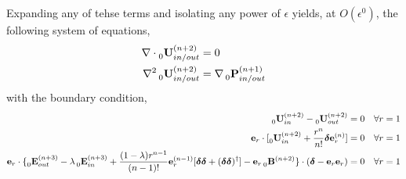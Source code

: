 Expanding any of tehse terms and isolating any power of $\epsilon$ yields, at $O(\epsilon^0)$, the following system of equations, 
\begin{align*}
    \mathbf{\nabla}\cdot \prescript{}{0}{\textbf{U}}_{in/out}^{(n+2)} &= 0 \\
    \mathbf{\nabla}^2\prescript{}{0}{\textbf{U}}_{in/out}^{(n+2)} &= \mathbf{\nabla} \prescript{}{0}{\textbf{P}}_{in/out}^{(n+1)} \\
\end{align*}
with the boundary condition, 
\begin{align}
    \prescript{}{0}{\textbf{U}}_{in}^{(n+2)} - \prescript{}{0}{\textbf{U}}_{out}^{(n+2)}
    &=
    0
    &&\forall r = 1 
    \\
    \textbf{e}_r\cdot [\prescript{}{0}{\textbf{U}}_{in}^{(n+2)} 
    +\frac{r^n}{n!}\bm\delta \textbf{e}_r^{(n)}] &= 0 
    &&\forall r = 1 \\
    \textbf{e}_r\cdot \{
        \prescript{}{0}{\textbf{E}}_{out}^{(n+3)}
        -\lambda\prescript{}{0}{\textbf{E}}_{in}^{(n+3)}
        +\frac{(1-\lambda)r^{n-1}}{(n-1)!}
        \textbf{e}_r^{(n-1)}[\bm\delta\bm\delta + (\bm\delta\bm\delta)^\dagger]
        - \textbf{e}_r\prescript{}{0}{\textbf{B}}^{(n+2)}
    \}\cdot (\bm\delta - \textbf{e}_r \textbf{e}_r)
    &=
    0
    &&\forall r = 1
\end{align}


